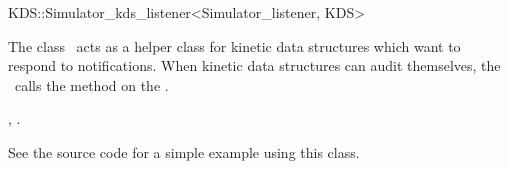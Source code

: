 

\begin{ccRefClass}{KDS::Simulator_kds_listener<Simulator_listener, KDS>}  %


\ccDefinition
  
The class \ccRefName\ acts as a helper class for kinetic data
structures which want to respond to
 notifications. When kinetic
data structures can audit themselves, the \ccRefName\ calls the
 method on the .



\ccCreation
{}  %


\ccSeeAlso

,
.

\ccExample

See the  source code for a simple
example using this class.


\end{ccRefClass}


